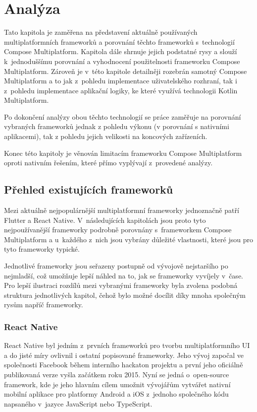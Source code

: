 \chapter{Analýza}
Tato kapitola je zaměřena na představení aktuálně používaných multiplatformních frameworků a porovnání těchto frameworků
s~technologií Compose Multiplatform. Kapitola dále shrnuje jejich podstatné rysy a slouží
k~jednoduššímu porovnání a vyhodnocení použitelnosti frameworku Compose Multiplatform. Zároveň je v~této kapitole detailněji
rozebrán samotný Compose Multiplatform a to jak z~pohledu implementace uživatelského rozhraní, tak i z~pohledu implementace
aplikační logiky, ke které využívá technologii Kotlin Multiplatform.

Po dokončení analýzy obou těchto technologií se práce zaměřuje na porovnání vybraných frameworků jednak z pohledu výkonu 
(v porovnání s nativními aplikacemi), tak z pohledu jejich velikosti na koncových zařízeních.

Konec této kapitoly je věnován limitacím frameworku Compose Multiplatform oproti nativním řešením, které přímo vyplývají 
z~provedené analýzy.  


\section{Přehled existujících frameworků}
Mezi aktuálně nejpopulárnější multiplatformní frameworky jednoznačně patří Flutter a React Native. \cite{crossPlatformFrameworksStats}
V~následujících kapitolách jsou proto tyto nejpoužívanější frameworky podrobně porovnány s~frameworkem Compose Multiplatform a u~každého z~nich 
jsou vybrány důležité vlastnosti, které jsou pro tyto frameworky typické. 

Jednotlivé frameworky jsou seřazeny postupně od vývojově nejstaršího
po nejmladší, což umožňuje lepší náhled na to, jak se frameworky vyvíjely v~čase. Pro lepší ilustraci rozdílů 
mezi vybranými frameworky byla zvolena 
podobná struktura jednotlivých kapitol, čehož bylo možné docílit díky mnoha společným rysům napříč frameworky.

\subsection{React Native}
React Native byl jedním z~prvních frameworků pro tvorbu multiplatformního UI a do jisté míry ovlivnil i ostatní popisované
frameworky. Jeho vývoj započal ve společnosti Facebook během interního hackaton projektu a první jeho oficiálně publikovaná
verze vyšla začátkem roku 2015. \cite{reactNativeHistory}
Nyní se jedná o~open-source framework, kde je jeho hlavním cílem umožnit vývojářům vytvářet nativní mobilní aplikace 
pro platformy Android a iOS z~jednoho společného kódu napsaného v~jazyce JavaScript nebo TypeScript.

